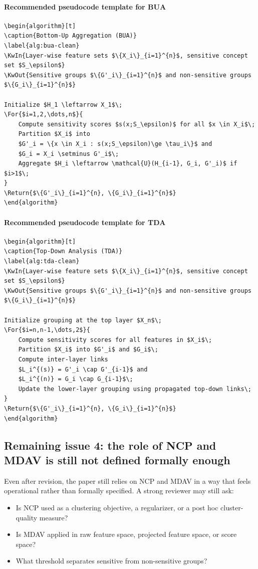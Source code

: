 \documentclass[11pt]{article}
\begin{document}
\paragraph{Recommended pseudocode template for BUA}
\begin{verbatim}
\begin{algorithm}[t]
\caption{Bottom-Up Aggregation (BUA)}
\label{alg:bua-clean}
\KwIn{Layer-wise feature sets $\{X_i\}_{i=1}^{n}$, sensitive concept set $S_\epsilon$}
\KwOut{Sensitive groups $\{G'_i\}_{i=1}^{n}$ and non-sensitive groups $\{G_i\}_{i=1}^{n}$}

Initialize $H_1 \leftarrow X_1$\;
\For{$i=1,2,\dots,n$}{
    Compute sensitivity scores $s(x;S_\epsilon)$ for all $x \in X_i$\;
    Partition $X_i$ into
    $G'_i = \{x \in X_i : s(x;S_\epsilon)\ge \tau_i\}$ and
    $G_i = X_i \setminus G'_i$\;
    Aggregate $H_i \leftarrow \mathcal{U}(H_{i-1}, G_i, G'_i)$ if $i>1$\;
}
\Return{$\{G'_i\}_{i=1}^{n}, \{G_i\}_{i=1}^{n}$}
\end{algorithm}
\end{verbatim}

\paragraph{Recommended pseudocode template for TDA}
\begin{verbatim}
\begin{algorithm}[t]
\caption{Top-Down Analysis (TDA)}
\label{alg:tda-clean}
\KwIn{Layer-wise feature sets $\{X_i\}_{i=1}^{n}$, sensitive concept set $S_\epsilon$}
\KwOut{Sensitive groups $\{G'_i\}_{i=1}^{n}$ and non-sensitive groups $\{G_i\}_{i=1}^{n}$}

Initialize grouping at the top layer $X_n$\;
\For{$i=n,n-1,\dots,2$}{
    Compute sensitivity scores for all features in $X_i$\;
    Partition $X_i$ into $G'_i$ and $G_i$\;
    Compute inter-layer links
    $L_i^{(s)} = G'_i \cap G'_{i-1}$ and
    $L_i^{(n)} = G_i \cap G_{i-1}$\;
    Update the lower-layer grouping using propagated top-down links\;
}
\Return{$\{G'_i\}_{i=1}^{n}, \{G_i\}_{i=1}^{n}$}
\end{algorithm}
\end{verbatim}

\subsection*{Remaining issue 4: the role of NCP and MDAV is still not defined formally enough}
Even after revision, the paper still relies on NCP and MDAV in a way that feels operational rather than formally specified. A strong reviewer may still ask:
\begin{itemize}
    \item Is NCP used as a clustering objective, a regularizer, or a post hoc cluster-quality measure?
    \item Is MDAV applied in raw feature space, projected feature space, or score space?
    \item What threshold separates sensitive from non-sensitive groups?
\end{itemize}
\end{document}
